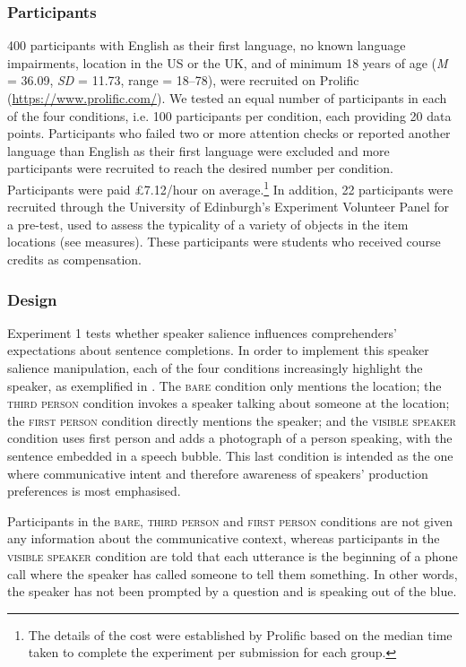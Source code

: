 \documentclass[output=paper,colorlinks,citecolor=brown]{langscibook}
\begin{document}
\subsubsection{Participants}

400 participants with English as their first language, no known language impairments, location in the US or the UK, and of minimum 18 years of age (\textit{M} = 36.09, \textit{SD} = 11.73, range = 18–78), were recruited on Prolific (\url{https://www.prolific.com/}). We tested an equal number of participants in each of the four conditions, i.e. 100 participants per condition, each providing 20 data points. Participants who failed two or more attention checks or reported another language than English as their first language were excluded and more participants were recruited to reach the desired number per condition. Participants were paid £7.12/hour on average.\footnote{The details of the cost were established by Prolific based on the median time taken to complete the experiment per submission for each group.} In addition, 22 participants were recruited through the University of Edinburgh’s Experiment Volunteer Panel for a pre-test, used to assess the typicality of a variety of objects in the item locations (see measures). These participants were students who received course credits as compensation.

\subsubsection{Design}

Experiment 1 tests whether speaker salience influences comprehenders' expectations about sentence completions. In order to implement this speaker salience manipulation, each of the four conditions increasingly highlight the speaker, as exemplified in . The \textsc{bare} condition only mentions the location; the \textsc{\textsc{third person}} condition invokes a speaker talking about someone at the location; the \textsc{first person} condition directly mentions the speaker; and the \textsc{visible speaker} condition uses first person and adds a photograph of a person speaking, with the sentence embedded in a speech bubble. This last condition is intended as the one where communicative intent and therefore awareness of speakers’ production preferences is most emphasised.

Participants in the \textsc{bare}, \textsc{\textsc{third person}} and \textsc{first person} conditions are not given any information about the communicative context, whereas participants in the \textsc{visible speaker} condition are told that each utterance is the beginning of a phone call where the speaker has called someone to tell them something. In other words, the speaker has not been prompted by a question and is speaking out of the blue.
\end{document}
